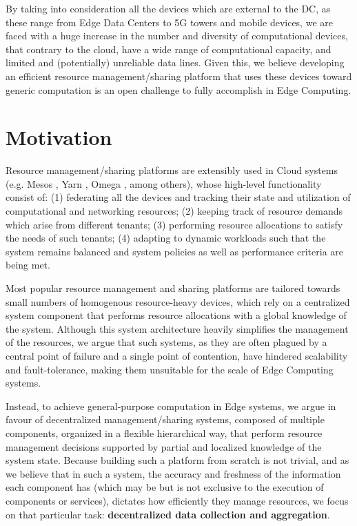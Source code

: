 By taking into consideration all the devices which are external to the DC, as these range from Edge Data Centers to 5G towers and mobile devices, we are faced with a huge increase in the number and diversity of computational devices, that contrary to the cloud, have a wide range of computational capacity, and limited and (potentially) unreliable data lines. Given this, we believe developing an efficient resource management/sharing platform that uses these devices toward generic computation is an open challenge to fully accomplish in Edge Computing.

\section{Motivation}

Resource management/sharing platforms are extensibly used in Cloud systems (e.g. Mesos \cite{hindman2011mesos}, Yarn \cite{Vavilapalli2013ApacheHY}, Omega \cite{41684}, among others), whose high-level functionality consist of: (1) federating all the devices and tracking their state and utilization of computational and networking resources; (2) keeping track of resource demands which arise from different tenants; (3) performing resource allocations to satisfy the needs of such tenants; (4) adapting to dynamic workloads such that the system remains balanced and system policies as well as performance criteria are being met.

Most popular resource management and sharing platforms are tailored towards small numbers of homogenous resource-heavy devices, which rely on a centralized system component that performs resource allocations with a global knowledge of the system. Although this system architecture heavily simplifies the management of the resources, we argue that such systems, as they are often plagued by a central point of failure and a single point of contention, have hindered scalability and fault-tolerance, making them unsuitable for the scale of Edge Computing systems. 

Instead, to achieve general-purpose computation in Edge systems, we argue in favour of decentralized management/sharing systems, composed of multiple components, organized in a flexible hierarchical way, that perform resource management decisions supported by partial and localized knowledge of the system state. Because building such a platform from scratch is not trivial, and as we believe that in such a system, the accuracy and freshness of the information each component has (which may be but is not exclusive to the execution of components or services), dictates how efficiently they manage resources, we focus on that particular task: \textbf{decentralized data collection and aggregation}.


